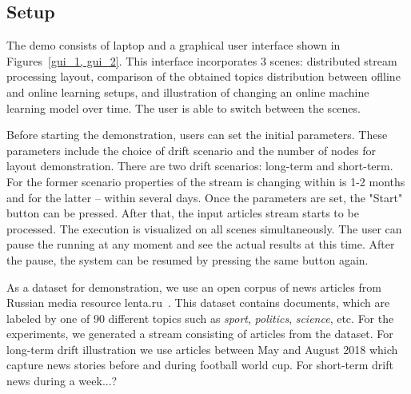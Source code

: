 




\subsection{Setup}

The demo consists of laptop and a graphical user interface shown in Figures~\ref{gui_1, gui_2}. This interface incorporates 3 scenes: distributed stream processing layout, comparison of the obtained topics distribution between oflline and online learning setups, and illustration of changing an online machine learning model over time. The user is able to switch between the scenes. 

Before starting the demonstration, users can set the initial parameters. These parameters include the choice of drift scenario and the number of nodes for layout demonstration. There are two drift scenarios: long-term and short-term. For the former scenario properties of the stream is changing within is 1-2 months and for the latter -- within several days. Once the parameters are set, the "Start" button can be pressed. After that, the input articles stream starts to be processed. The execution is visualized on all scenes simultaneously. The user can pause the running at any moment and see the actual results at this time. After the pause, the system can be resumed by pressing the same button again.

As a dataset for demonstration, we use an open corpus of news articles from Russian media resource lenta.ru~\cite{lentaru}. This dataset contains documents, which are labeled by one of 90 different topics such as {\em sport}, {\em politics}, {\em science}, etc. For the experiments, we generated a stream consisting of articles from the dataset. For long-term drift illustration we use articles between May and August 2018 which capture news stories before and during football world cup. For short-term drift news during a week...?

